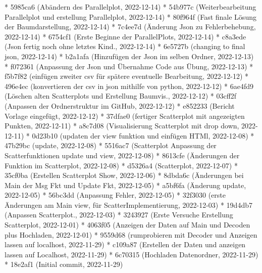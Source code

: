 \documentclass[usegeometry=true]{scrartcl}
\begin{document}
* 5985ca6 (Abändern des Parallelplot, 2022-12-14)
* 54b977c (Weiterbearbeitung Parallelplot und erstellung Parallelplot, 2022-12-14)
* 80f964f (Fast finale Lösung der Baumdarstellung, 2022-12-14)
* 7c4ee7d (Änderung Json zu Fehlerbehebung, 2022-12-14)
* 6754cf1 (Erste Beginne der ParallelPlots, 2022-12-14)
* c8a3ede (Json fertig noch ohne letztes Kind., 2022-12-14)
* 6e5727b (changing to final json, 2022-12-14)
* b2a1afa (Hinzufügen der Json im selben Ordner, 2022-12-13)
* f072361 (Anpassung der Json und Übernahme Code aus Übung, 2022-12-13)
* f5b7f82 (einfügen zweiter csv für spätere eventuelle Bearbeitung, 2022-12-12)
* 496e4ec (konvertieren der csv in json mithilfe von python, 2022-12-12)
* 6ae4fd9 (Löschen alten Scatterplots und Erstellung Baumvis., 2022-12-12)
* 03cff2f (Anpassen der Ordnerstruktur im GitHub, 2022-12-12)
* e852233 (Bericht Vorlage eingefügt, 2022-12-12)
* 37dfae0 (fertiger Scatterplot mit angezeigten Punkten, 2022-12-11)
* a8c7d08 (Visualisierung Scatterplot mit drop down, 2022-12-11)
* 0d23b10 (updaten der view funktion und einfügen HTMl, 2022-12-08)
* 47b29bc (update, 2022-12-08)
* 5516ac7 (Scatterplot Anpassung der Scatterfunktionen update und view, 2022-12-08)
* 8613cfe (Änderungen der Funktion im Scatterplot, 2022-12-08)
* d5326a4 (Scatterplot, 2022-12-07)
* 35cf0ba (Erstellen Scatterplot Show, 2022-12-06)
* 8dbda6c (Änderungen bei Main der Msg Fkt und Update Fkt, 2022-12-05)
* a5bf6fa (Änderung update, 2022-12-05)
* 56bc3dd (Anpassung Fehler, 2022-12-05)
* 32f3030 (erste Änderungen am Main view, für ScatterImplementierung, 2022-12-03)
* 19d4db7 (Anpassen Scatterplot., 2022-12-03)
* 3243927 (Erste Versuche Erstellung Scatterplot, 2022-12-01)
* 4063f05 (Anzeigen der Daten auf Main und Decoden plus Hochladen, 2022-12-01)
* 9559d68 (rumprobieren mit Decoder und Anzeigen lassen auf localhost, 2022-11-29)
* c109a87 (Erstellen der Daten und anzeigen lassen auf Localhost, 2022-11-29)
* 6c70315 (Hochladen Datenordner, 2022-11-29)
* 18e2af1 (Initial commit, 2022-11-29)
\end{document}
